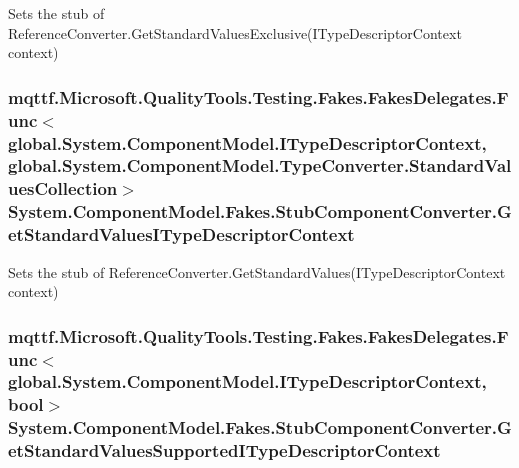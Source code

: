 Sets the stub of Reference\-Converter.\-Get\-Standard\-Values\-Exclusive(\-I\-Type\-Descriptor\-Context context)

\hypertarget{class_system_1_1_component_model_1_1_fakes_1_1_stub_component_converter_a8b064dc91f62321b839fe3500ce7318c}{
\subsubsection[{Get\-Standard\-Values\-I\-Type\-Descriptor\-Context}]{\setlength{\rightskip}{0pt plus 5cm}mqttf.\-Microsoft.\-Quality\-Tools.\-Testing.\-Fakes.\-Fakes\-Delegates.\-Func$<$global.\-System.\-Component\-Model.\-I\-Type\-Descriptor\-Context, global.\-System.\-Component\-Model.\-Type\-Converter.\-Standard\-Values\-Collection$>$ System.\-Component\-Model.\-Fakes.\-Stub\-Component\-Converter.\-Get\-Standard\-Values\-I\-Type\-Descriptor\-Context}}\label{class_system_1_1_component_model_1_1_fakes_1_1_stub_component_converter_a8b064dc91f62321b839fe3500ce7318c}


Sets the stub of Reference\-Converter.\-Get\-Standard\-Values(\-I\-Type\-Descriptor\-Context context)

\hypertarget{class_system_1_1_component_model_1_1_fakes_1_1_stub_component_converter_a2a8aef88755ab5b501294f744f1a92e3}{
\subsubsection[{Get\-Standard\-Values\-Supported\-I\-Type\-Descriptor\-Context}]{\setlength{\rightskip}{0pt plus 5cm}mqttf.\-Microsoft.\-Quality\-Tools.\-Testing.\-Fakes.\-Fakes\-Delegates.\-Func$<$global.\-System.\-Component\-Model.\-I\-Type\-Descriptor\-Context, bool$>$ System.\-Component\-Model.\-Fakes.\-Stub\-Component\-Converter.\-Get\-Standard\-Values\-Supported\-I\-Type\-Descriptor\-Context}}\label{class_system_1_1_component_model_1_1_fakes_1_1_stub_component_converter_a2a8aef88755ab5b501294f744f1a92e3}



